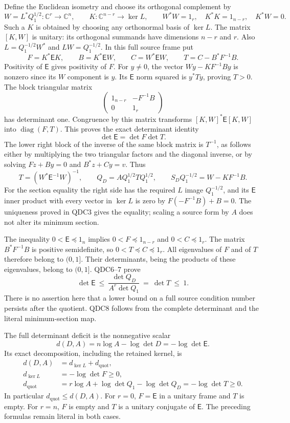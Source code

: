 \documentclass[11pt,a4paper]{article}
\begin{document}
Define the Euclidean isometry and choose its orthogonal complement
by
\[
 W=L^*Q_1^{1/2}:\mathbb C^r\longrightarrow\mathbb C^n,\qquad
 K:\mathbb C^{n-r}\longrightarrow\ker L,\qquad
 W^*W=1_r,\quad K^*K=1_{n-r},\quad K^*W=0.
 \tag{QDC4}
\]
Such a $K$ is obtained by choosing any orthonormal basis of $\ker L$.
The matrix $[K,W]$ is unitary: its orthogonal summands have dimensions
$n-r$ and $r$. Also
$L=Q_1^{-1/2}W^*$ and $LW=Q_1^{-1/2}$.
In this full source frame put
\[
 F=K^*\mathsf EK,\qquad B=K^*\mathsf EW,\qquad
 C=W^*\mathsf EW,\qquad T=C-B^*F^{-1}B.
 \tag{QDC5}
\]
Positivity of $\mathsf E$ gives positivity of $F$. For $y\ne0$,
the vector $W y-KF^{-1}By$ is nonzero since its $W$ component is
$y$. Its $\mathsf E$ norm squared is $y^*Ty$, proving $T>0$.
The block triangular matrix
\[
 \begin{pmatrix}1_{n-r}&-F^{-1}B\\0&1_r\end{pmatrix}
\]
has determinant one. Congruence by this matrix transforms
$[K,W]^*\mathsf E[K,W]$ into $\operatorname{diag}(F,T)$.
This proves the exact determinant identity
\[
 \det\mathsf E=\det F\det T .
 \tag{QDC6}
\]
The lower right block of the inverse of the same block matrix is
$T^{-1}$, as follows either by multiplying the two triangular
factors and the diagonal inverse, or by solving
$Fz+By=0$ and $B^*z+Cy=v$. Thus
\[
 T=(W^*\mathsf E^{-1}W)^{-1},\qquad
 Q_D=AQ_1^{1/2}TQ_1^{1/2},\qquad
 S_DQ_1^{-1/2}=W-KF^{-1}B .
 \tag{QDC7}
\]
For the section equality the right side has the required $L$ image
$Q_1^{-1/2}$, and its $\mathsf E$ inner product with every vector
in $\ker L$ is zero by $F(-F^{-1}B)+B=0$. The uniqueness proved
in QDC3 gives the equality; scaling a source form by $A$ does not
alter its minimum section.

The inequality $0<\mathsf E\preceq1_n$ implies
$0<F\preceq1_{n-r}$ and $0<C\preceq1_r$. The matrix
$B^*F^{-1}B$ is positive semidefinite, so
$0<T\preceq C\preceq1_r$. All eigenvalues of $F$ and of $T$
therefore belong to $(0,1]$. Their determinants, being the products
of these eigenvalues, belong to $(0,1]$. QDC6--7 prove
\[
 \boxed{\displaystyle
 \det\mathsf E
 \ \le\ \frac{\det Q_D}{A^r\det Q_1}
 \ =\ \det T\ \le\ 1 .}
 \tag{QDC8}
\]
There is no assertion here that a lower bound on a full source
condition number persists after the quotient. QDC8 follows from
the complete determinant and the literal minimum-section map.

The full determinant deficit is the nonnegative scalar
\[
 d(D,A)=n\log A-\log\det D=-\log\det\mathsf E.
 \tag{QDC9}
\]
Its exact decomposition, including the retained kernel, is
\[
 \begin{split}
 d(D,A)&=d_{\ker L}+d_{\mathrm{quot}},\\
 d_{\ker L}&=-\log\det F\ge0,\\
 d_{\mathrm{quot}}
 &=r\log A+\log\det Q_1-\log\det Q_D
   =-\log\det T\ge0.
 \end{split}
 \tag{QDC10}
\]
In particular $d_{\mathrm{quot}}\le d(D,A)$.
For $r=0$, $F=\mathsf E$ in a unitary frame and $T$ is empty.
For $r=n$, $F$ is empty and $T$ is a unitary conjugate of
$\mathsf E$. The preceding formulas remain literal in both cases.
\end{document}
